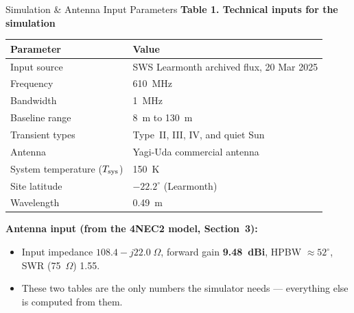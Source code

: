 \documentclass{beamer}
\newcounter{sframe}[section]
\renewcommand{\thesframe}{\thesection.\arabic{sframe}}
\newcommand{\ftitle}[1]{\stepcounter{sframe}{\normalsize\thesframe}\quad #1}
\begin{document}
\begin{frame}{\ftitle{Simulation \& Antenna Input Parameters}}
\textbf{Table 1. Technical inputs for the simulation}
\begin{table}
\footnotesize
\centering
\begin{tabular}{ll}
\toprule
\textbf{Parameter} & \textbf{Value} \\
\midrule
Input source     & SWS Learmonth archived flux, 20 Mar 2025 \\
Frequency        & 610~MHz \\
Bandwidth        & 1~MHz \\
Baseline range   & 8~m to 130~m \\
Transient types  & Type~II, III, IV, and quiet Sun \\
Antenna          & Yagi-Uda commercial antenna \\
System temperature ($T_{\rm sys}$) & 150~K \\
Site latitude    & $-22.2^\circ$ (Learmonth) \\
Wavelength       & 0.49~m \\
\bottomrule
\end{tabular}
\end{table}
\vspace{2pt}
\textbf{Antenna input (from the 4NEC2 model, Section~3):}
\begin{itemize}
  \footnotesize
  \item Input impedance $108.4 - j22.0\;\Omega$, forward gain
  \textbf{9.48~dBi}, HPBW $\approx52^\circ$, SWR (75~$\Omega$) 1.55.
  \item[$\Rightarrow$] These two tables are the only numbers the
  simulator needs --- everything else is computed from them.
\end{itemize}
\end{frame}
\end{document}
